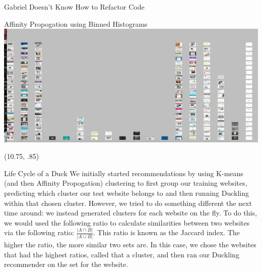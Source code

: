 \documentclass{beamer}
\begin{document}
\begin{frame}{\centerline{\Huge Gabriel Doesn't Know How to Refactor Code}}
\begin{textblock}{5}
\begin{block}{Affinity Propogation using Binned Histograms}
\includegraphics[scale=.5]{binAffProp.jpg}
\end{block}
\end{textblock}

\begin{textblock}{5}(10.75, .85)
\begin{block}{Life Cycle of a Duck}
We initially started recommendations by using K-means (and then Affinity Propogation) clustering to first group our training websites, predicting which cluster our test website belongs to and then running Duckling within that chosen cluster. However, we tried to do something different the next time around: we instead generated clusters for each website on the fly. To do this, we would used the following ratio to calculate similarities between two websites via the following ratio: $\frac{|A \cap B|}{|A \cup B|}$. This ratio is known as the Jaccard index. The higher the ratio, the more similar two sets are. In this case, we chose the websites that had the highest ratios, called that a cluster, and then ran our Duckling recommender on the set for the website.
\end{block}
\end{textblock}
\end{frame}
\end{document}
